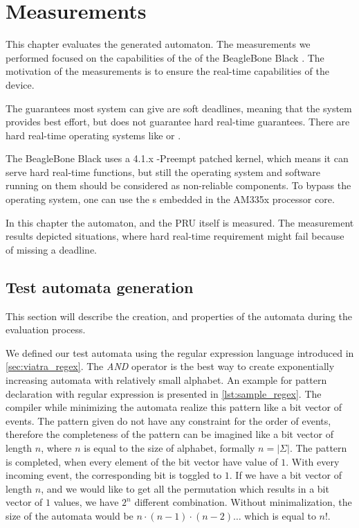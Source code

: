 
\chapter{Measurements}
\label{ch:measurements}

This chapter evaluates the generated automaton. The measurements we performed focused on the capabilities of the \pru{} of the BeagleBone Black \sbc{}. The motivation of the measurements is to ensure the real-time capabilities of the device.

The guarantees most system can give are soft deadlines, meaning that the system provides best effort, but does not guarantee hard real-time guarantees. There are hard real-time operating systems like  or .

The BeagleBone Black uses a 4.1.x -Preempt patched kernel, which means it can serve hard real-time functions, but still the operating system and software running on them should be considered as non-reliable components. To bypass the operating system, one can use the \pru{}s embedded in the AM335x processor core.

In this chapter the automaton, and the PRU itself is measured. The measurement results depicted situations, where hard real-time requirement might fail because of missing a deadline.

\section{Test automata generation}

This section will describe the creation, and properties of the automata during the evaluation process.

We defined our test automata using the regular expression language introduced in \ref{sec:viatra_regex}. The \emph{AND} operator is the best way to create exponentially increasing automata with relatively small alphabet. An example for pattern declaration with regular expression is presented in \cref{lst:sample_regex}.
The compiler while minimizing the automata realize this pattern like a bit vector of events. The pattern given do not have any constraint for the order of events, therefore the completeness of the pattern can be imagined like a bit vector of length $n$, where $n$ is equal to the size of alphabet, formally $n=|\Sigma|$. The pattern is completed, when every element of the bit vector have value of $1$.
With every incoming event, the corresponding bit is toggled to $1$. If we have a bit vector of length $n$, and we would like to get all the permutation which results in a bit vector of $1$ values, we have $2^n$ different combination. Without minimalization, the size of the automata would be $n \cdot (n-1) \cdot (n-2) \ldots $ which is equal to $n!$.

